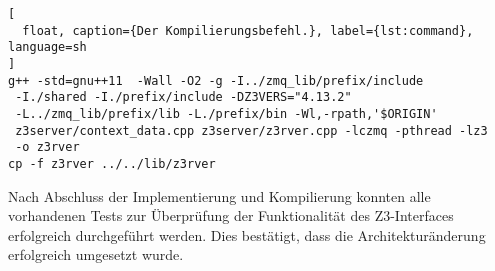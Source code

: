 \begin{lstlisting}[
  float, caption={Der Kompilierungsbefehl.}, label={lst:command}, language=sh
]
g++ -std=gnu++11  -Wall -O2 -g -I../zmq_lib/prefix/include
 -I./shared -I./prefix/include -DZ3VERS="4.13.2"
 -L../zmq_lib/prefix/lib -L./prefix/bin -Wl,-rpath,'$ORIGIN'
 z3server/context_data.cpp z3server/z3rver.cpp -lczmq -pthread -lz3
 -o z3rver
cp -f z3rver ../../lib/z3rver
\end{lstlisting}

Nach Abschluss der Implementierung und Kompilierung konnten alle vorhandenen Tests zur Überprüfung der Funktionalität des Z3-Interfaces erfolgreich durchgeführt werden.
Dies bestätigt, dass die Architekturänderung erfolgreich umgesetzt wurde.
